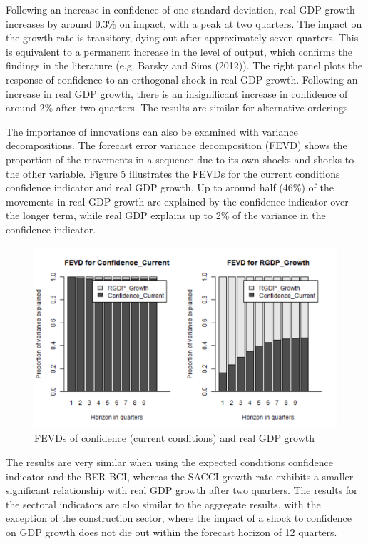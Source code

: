 \documentclass[11pt,]{article}
\begin{document}
Following an increase in confidence of one standard deviation, real GDP
growth increases by around 0.3\% on impact, with a peak at two quarters.
The impact on the growth rate is transitory, dying out after
approximately seven quarters. This is equivalent to a permanent increase
in the level of output, which confirms the findings in the literature
(e.g. Barsky and Sims (2012)). The right panel plots the response of
confidence to an orthogonal shock in real GDP growth. Following an
increase in real GDP growth, there is an insignificant increase in
confidence of around 2\% after two quarters. The results are similar for
alternative orderings.

The importance of innovations can also be examined with variance
decompositions. The forecast error variance decomposition (FEVD) shows
the proportion of the movements in a sequence due to its own shocks and
shocks to the other variable. Figure 5 illustrates the FEVDs for the
current conditions confidence indicator and real GDP growth. Up to
around half (46\%) of the movements in real GDP growth are explained by
the confidence indicator over the longer term, while real GDP explains
up to 2\% of the variance in the confidence indicator.

\begin{figure}
\centering
\includegraphics{BCon_5_Journal_files/figure-latex/figure5-1.pdf}
\caption{FEVDs of confidence (current conditions) and real GDP growth}
\end{figure}

The results are very similar when using the expected conditions
confidence indicator and the BER BCI, whereas the SACCI growth rate
exhibits a smaller significant relationship with real GDP growth after
two quarters. The results for the sectoral indicators are also similar
to the aggregate results, with the exception of the construction sector,
where the impact of a shock to confidence on GDP growth does not die out
within the forecast horizon of 12 quarters.
\end{document}
